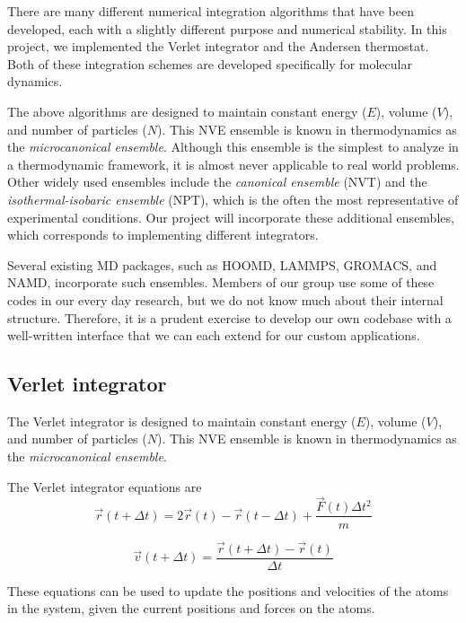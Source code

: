 \documentclass[10pt]{article}
\begin{document}
There are many different numerical integration algorithms that have been developed, each with a slightly different purpose and numerical stability.  
%
In this project, we implemented the Verlet integrator and the Andersen thermostat.
%
Both of these integration schemes are developed specifically for molecular dynamics.

The above algorithms are designed to maintain constant energy ($E$), volume ($V$), and number of particles ($N$).  This NVE ensemble is known in thermodynamics as the {\em microcanonical ensemble}.
Although this ensemble is the simplest to analyze in a thermodynamic framework, it is almost never applicable to real world problems.
Other widely used ensembles include the {\em canonical ensemble} (NVT) and the {\em isothermal-isobaric ensemble} (NPT), which is the often the most representative of experimental conditions.
Our project will incorporate these additional ensembles, which corresponds to implementing different integrators.

Several existing MD packages, such as HOOMD, LAMMPS, GROMACS, and NAMD, incorporate such ensembles. Members of our group use some of these codes in our every day research, but we do not know much about their internal structure. Therefore, it is a prudent exercise to develop our own codebase with a well-written interface that we can each extend for our custom applications.

\subsection{Verlet integrator}
The Verlet integrator is designed to maintain constant energy ($E$), volume ($V$), and number of particles ($N$).  
%
This NVE ensemble is known in thermodynamics as the {\em microcanonical ensemble}.

The Verlet integrator equations are
$$ \overrightarrow{r}(t + \Delta t) = 2 \overrightarrow{r}(t) - \overrightarrow{r}(t- \Delta t) + \frac{\overrightarrow{F}(t) \Delta t ^2}{m}$$

$$ \overrightarrow{v}(t + \Delta t) = \frac{\overrightarrow{r}(t + \Delta t) - \overrightarrow{r}(t)} {\Delta t} $$

These equations can be used to update the positions and velocities of the atoms in the system, given the current positions and forces on the atoms.
\end{document}
